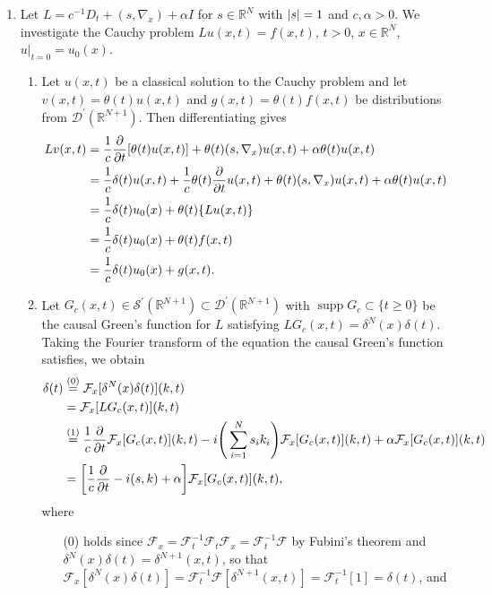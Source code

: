 \documentclass[11pt]{article}
\newcommand{\eq}[1]{\overset{(#1)}{=}}
\DeclareMathOperator{\supp}{supp}
\begin{document}
\begin{enumerate}
    \hrulefill

    \item Let $L = c^{-1}D_t + (s,\nabla_x)+\alpha I$ for $s\in\mathbb R^N$ with $\abs{s} = 1$ and $c,\alpha>0$. We investigate the Cauchy problem $Lu(x,t) = f(x,t)$, $t>0$, $x\in \mathbb R^N$, $u|_{t=0} = u_0(x)$.
    \begin{enumerate}[label=(\roman*)]
        \item Let $u(x,t)$ be a classical solution to the Cauchy problem and let $v(x,t) = \theta(t)u(x,t)$ and $g(x,t) = \theta(t)f(x,t)$ be distributions from $\mathcal D^\prime(\mathbb R^{N+1})$. Then differentiating gives
        \begin{align*}
            Lv(x,t) &= \frac{1}{c}\pdv t[\theta(t)u(x,t)] + \theta(t)(s,\nabla_x)u(x,t) + \alpha\theta(t)u(x,t)\\
            &= \frac{1}{c}\delta(t)u(x,t) + \frac{1}{c}\theta(t)\pdv t u(x,t) + \theta(t)(s,\nabla_x)u(x,t) + \alpha\theta(t)u(x,t)\\
            &= \frac{1}{c}\delta(t)u_0(x) + \theta(t)\{Lu(x,t)\}\\
            &= \frac{1}{c}\delta(t)u_0(x) + \theta(t)f(x,t)\\
            &= \frac{1}{c}\delta(t)u_0(x) + g(x,t).
        \end{align*}
        \item Let $G_c(x,t)\in\mathcal S^\prime(\mathbb R^{N+1})\subset \mathcal D^\prime(\mathbb R^{N+1})$ with $\supp G_c\subset \{t\geq 0\}$ be the causal Green's function for $L$ satisfying $LG_c(x,t) = \delta^N(x)\delta(t)$. Taking the Fourier transform of the equation the causal Green's function satisfies, we obtain
        \begin{align*}
            \delta(t) &\eq{0} \mathcal F_x[\delta^N(x)\delta(t)](k,t)\\
            &= \mathcal F_x[LG_c(x,t)](k,t) \\
            &\eq{1} \frac{1}{c}\pdv t \mathcal F_x[G_c(x,t)](k,t) - i\Bigg(\sum_{i=1}^N s_ik_i\Bigg)\mathcal F_x[G_c(x,t)](k,t) + \alpha \mathcal F_x[G_c(x,t)](k,t)\\
            &= \bigg[\frac{1}{c}\pdv t - i(s,k)+\alpha\bigg]\mathcal F_x[G_c(x,t)](k,t),
        \end{align*} where \begin{enumerate}
            \item[(0)] holds since $\mathcal F_x = \mathcal F_t^{-1}\mathcal F_t\mathcal F_x =\mathcal F_t^{-1}\mathcal F$ by Fubini's theorem and $\delta^N(x)\delta(t) = \delta^{N+1}(x,t)$, so that $\mathcal F_x[\delta^N(x)\delta(t)] = \mathcal F_t^{-1}\mathcal F[\delta^{N+1}(x,t)] = \mathcal F_t^{-1}[1] = \delta(t)$, and

\end{enumerate}
\end{enumerate}
\end{enumerate}
\end{document}
